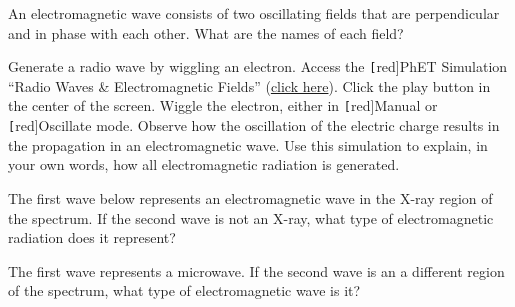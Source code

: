 \documentclass[main.tex]{subfiles}
\begin{document}
\begin{exercise}
    An electromagnetic wave consists of two oscillating fields that are perpendicular and in phase with each other. What are the names of each field?
\end{exercise}

\begin{exercise}
    Generate a radio wave by wiggling an electron. Access the \texttt[red]{PhET Simulation} ``Radio Waves \& Electromagnetic Fields'' (\href{https://phet.colorado.edu/en/simulations/radio-waves}{click here}). Click the play button in the center of the screen. Wiggle the electron, either in \texttt[red]{Manual} or \texttt[red]{Oscillate} mode. Observe how the oscillation of the electric charge results in the propagation in an electromagnetic wave. Use this simulation to explain, in your own words, how all electromagnetic radiation is generated.
\end{exercise}

\begin{exercise}
    The first wave below represents an electromagnetic wave in the X-ray region of the spectrum. If the second wave is not an X-ray, what type of electromagnetic radiation does it represent?
\end{exercise}

\begin{center}
\end{center}

\begin{exercise}
    The first wave represents a microwave. If the second wave is an a different region of the spectrum, what type of electromagnetic wave is it?
\end{exercise}
\end{document}
